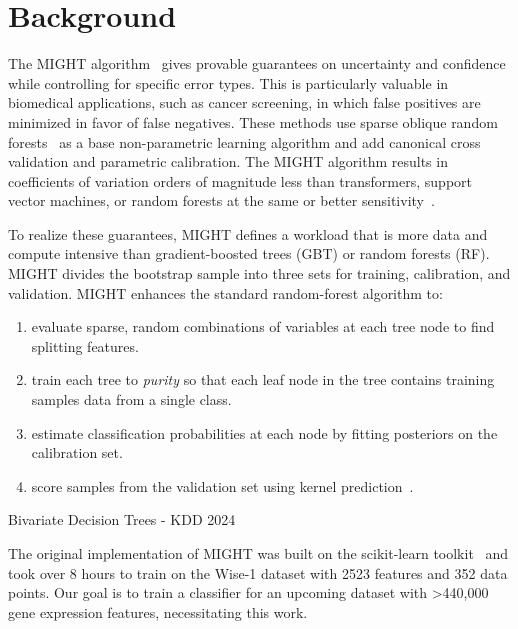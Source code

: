 \documentclass[sigconf]{acmart}
\begin{document}
\section{Background}\label{sec:bg}

The MIGHT algorithm~\cite{might1,might2} gives provable guarantees on uncertainty and confidence while controlling for specific error types. This is particularly valuable in biomedical applications, such as cancer screening, in which false positives are minimized in favor of false negatives. These methods use sparse oblique random forests~\cite{tomita2020sparse} as a base non-parametric learning algorithm and add canonical cross validation and parametric calibration. The MIGHT algorithm results in coefficients of variation orders of magnitude less than transformers, support vector machines, or random forests at the same or better sensitivity~\cite{might1}.  

To realize these guarantees, MIGHT defines a workload that is more data and compute intensive than gradient-boosted trees (GBT) or random forests (RF). MIGHT divides the bootstrap sample into three sets for training, calibration, and validation. MIGHT enhances the standard random-forest algorithm to:
\begin{enumerate}
    \item\label{it:sparsity} evaluate sparse, random combinations of variables at each tree node to find splitting features.
    \item\label{it:purity} train each tree to {\em purity} so that each leaf node in the tree contains training samples data from a single class.
    \item estimate classification probabilities at each node by fitting posteriors on the calibration set.
    \item score samples from the validation set using kernel prediction~\cite{kernel}. 
\end{enumerate}

Bivariate Decision Trees - KDD 2024 \cite{https://kdd.org/kdd2024/research-track-papers/}

\noindent The original implementation of MIGHT was built on the scikit-learn toolkit~\cite{pedregosa2011scikit,treeple} and took over 8 hours to train on the Wise-1 dataset with 2523 features and 352 data points. Our goal is to train a classifier for an upcoming dataset with >440,000 gene expression features, necessitating this work.
\end{document}
